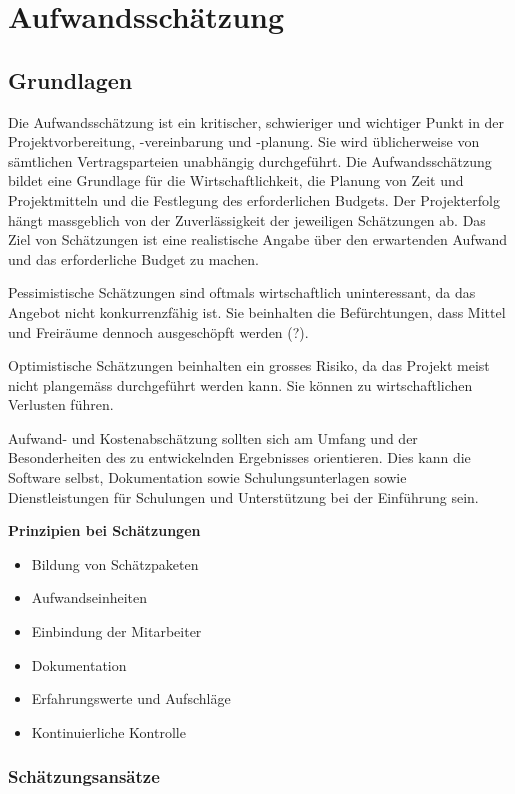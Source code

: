 \chapter{Aufwandsschätzung}

\section{Grundlagen}

Die Aufwandsschätzung ist ein kritischer, schwieriger und wichtiger Punkt in der Projektvorbereitung, -vereinbarung und -planung. Sie wird üblicherweise von sämtlichen Vertragsparteien unabhängig durchgeführt. Die Aufwandsschätzung bildet eine Grundlage für die Wirtschaftlichkeit, die Planung von Zeit und Projektmitteln und die Festlegung des erforderlichen Budgets. Der Projekterfolg hängt massgeblich von der Zuverlässigkeit der jeweiligen Schätzungen ab. 
Das Ziel von Schätzungen ist eine realistische Angabe über den erwartenden Aufwand und das erforderliche Budget zu machen.

Pessimistische Schätzungen sind oftmals wirtschaftlich uninteressant, da das Angebot nicht konkurrenzfähig ist. Sie beinhalten die Befürchtungen, dass Mittel und Freiräume dennoch ausgeschöpft werden (?).

Optimistische Schätzungen beinhalten ein grosses Risiko, da das Projekt meist nicht plangemäss durchgeführt werden kann. Sie können zu wirtschaftlichen Verlusten führen.

Aufwand- und Kostenabschätzung sollten sich am Umfang und der Besonderheiten des zu entwickelnden Ergebnisses orientieren. Dies kann die Software selbst, Dokumentation sowie Schulungsunterlagen sowie Dienstleistungen für Schulungen und Unterstützung bei der Einführung sein.

\textbf{Prinzipien bei Schätzungen}
\begin{itemize}
	\item Bildung von Schätzpaketen
	\item Aufwandseinheiten
	\item Einbindung der Mitarbeiter
	\item Dokumentation
	\item Erfahrungswerte und Aufschläge
	\item Kontinuierliche Kontrolle
\end{itemize}


\subsection{Schätzungsansätze}


